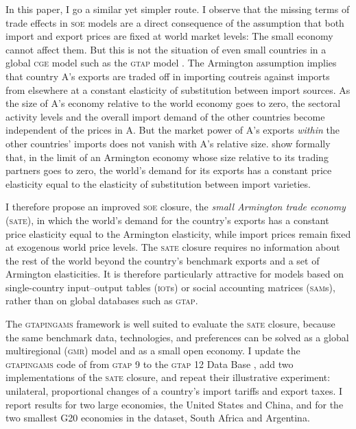 \documentclass{jgea}
\newcommand{\CGE}{\textsc{cge}\xspace}
\newcommand{\SOE}{\textsc{soe}\xspace}
\newcommand{\SATE}{\textsc{sate}\xspace}
\newcommand{\GMR}{\textsc{gmr}\xspace}
\newcommand{\IOT}{\textsc{iot}\xspace}
\newcommand{\SAM}{\textsc{sam}\xspace}
\newcommand{\GTAP}{\textsc{gtap}\xspace}
\newcommand{\GTAPINGAMS}{\textsc{gtapingams}\xspace}
\begin{document}
In this paper, I go a similar yet simpler route.
I observe that the missing terms of trade effects in \SOE models are a direct consequence of the assumption that both import and export prices are fixed at world market levels: The small economy cannot affect them.
But this is not the situation of even small countries in a global \CGE model such as the \GTAP model \citep{Corong2017}.
The Armington assumption implies that country A's exports are traded off in importing coutreis against imports from elsewhere  at a constant elasticity of substitution between import sources.
As the size of A's economy relative to the world economy goes to zero, the sectoral activity levels and the overall import demand of the other countries become independent of the prices in A.
But the market power of A's exports \emph{within} the other countries' imports does not vanish with A's relative size.
\citet{CaliendoFeenstra2024} show formally that, in the limit of an Armington economy whose size relative to its trading partners goes to zero, the world's demand for its exports has a constant price elasticity equal to the elasticity of substitution between import varieties.

I therefore propose an improved \SOE closure, the \emph{small Armington trade economy} (\SATE), in which the world's demand for the country's exports has a constant price elasticity equal to the Armington elasticity, while import prices remain fixed at exogenous world price levels.
The \SATE closure requires no information about the rest of the world beyond the country's benchmark exports and a set of Armington elasticities.
It is therefore particularly attractive for models based on single-country input--output tables (\IOT{}s) or social accounting matrices (\SAM{}s), rather than on global databases such as \GTAP.

The \GTAPINGAMS framework is well suited to evaluate the \SATE closure, because the same benchmark data, technologies, and preferences can be solved as a global multiregional (\GMR) model and as a small open economy.
I update the \GTAPINGAMS code of \citet{LanzRutherford2016} from \GTAP 9 to the \GTAP 12 Data Base \citep{Aguiar2025}, add two implementations of the \SATE closure, and repeat their illustrative experiment: unilateral, proportional changes of a country's import tariffs and export taxes.
I report results for two large economies, the United States and China, and for the two smallest G20 economies in the dataset, South Africa and Argentina.
\end{document}
